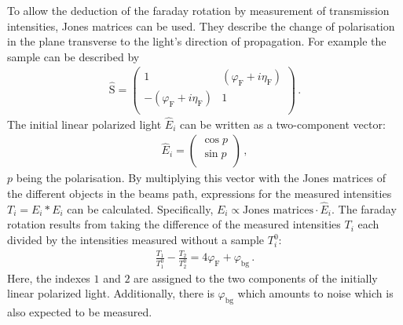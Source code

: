 	To allow the deduction of the faraday rotation by measurement of transmission intensities, Jones matrices can be used.
	They describe the change of polarisation in the plane transverse to the light's direction of propagation.
	For example the sample can be described by
	\begin{align*}
		\hat{\text{S}} = \left( \begin{array}{rr}
		1 & (\varphi_\text{F} + i\eta_\text{F}) \\
		-(\varphi_\text{F} + i\eta_\text{F}) & 1 \\
	\end{array}\right) \,.
	\end{align*}
	The initial linear polarized light $\hat{E}_i$ can be written as a two-component vector:
	\begin{align*}
		\hat{E}_i = \left( \begin{array}{r}
					\cos{p} \\
					\sin{p} \\
				\end{array}\right) \,,
	\end{align*}
	$p$ being the polarisation.
	By multiplying this vector with the Jones matrices of the different objects in the beams path, expressions for the measured intensities $T_i = E_i* E_i$ can be calculated.
  Specifically, $E_i \propto \text{Jones matrices} \cdot \hat{E}_i$.
  The faraday rotation results from taking the difference of the measured intensities $T_i$ each divided by the intensities measured without a sample $T_i^0$:
	\begin{align*}
		\frac{T_1}{T_1^0} - \frac{T_2}{T_2^0} = 4 \varphi_\text{F} + \varphi_\text{bg} \,.
	\end{align*}
	Here, the indexes $1$ and $2$ are assigned to the two components of the initially linear polarized light.
	Additionally, there is $\varphi_\text{bg}$ which amounts to noise which is also expected to be measured.
